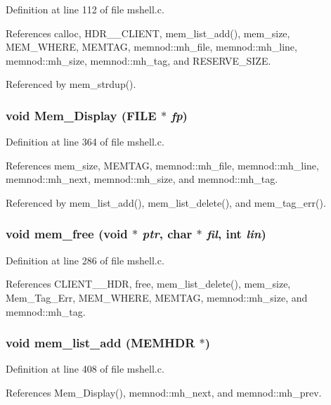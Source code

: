 Definition at line 112 of file mshell.c.

References calloc, HDR\_\_\-CLIENT, mem\_\-list\_\-add(), mem\_\-size, MEM\_\-WHERE, MEMTAG, memnod::mh\_\-file, memnod::mh\_\-line, memnod::mh\_\-size, memnod::mh\_\-tag, and RESERVE\_\-SIZE.

Referenced by mem\_\-strdup().
\subsubsection{\setlength{\rightskip}{0pt plus 5cm}void Mem\_\-Display (FILE $\ast$ {\em fp})}\label{mshell_8c_a19}




Definition at line 364 of file mshell.c.

References mem\_\-size, MEMTAG, memnod::mh\_\-file, memnod::mh\_\-line, memnod::mh\_\-next, memnod::mh\_\-size, and memnod::mh\_\-tag.

Referenced by mem\_\-list\_\-add(), mem\_\-list\_\-delete(), and mem\_\-tag\_\-err().
\subsubsection{\setlength{\rightskip}{0pt plus 5cm}void mem\_\-free (void $\ast$ {\em ptr}, char $\ast$ {\em fil}, int {\em lin})}\label{mshell_8c_a17}




Definition at line 286 of file mshell.c.

References CLIENT\_\_\-HDR, free, mem\_\-list\_\-delete(), mem\_\-size, Mem\_\-Tag\_\-Err, MEM\_\-WHERE, MEMTAG, memnod::mh\_\-size, and memnod::mh\_\-tag.
\subsubsection{\setlength{\rightskip}{0pt plus 5cm}void mem\_\-list\_\-add ({\bf MEMHDR} $\ast$)\hspace{0.3cm}{\tt  [static]}}\label{mshell_8c_a12}




Definition at line 408 of file mshell.c.

References Mem\_\-Display(), memnod::mh\_\-next, and memnod::mh\_\-prev.

